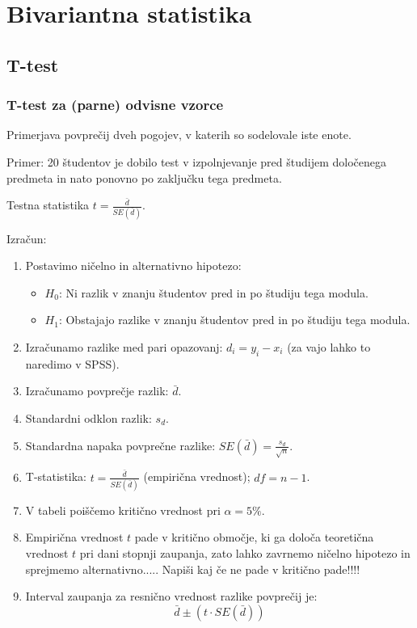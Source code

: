 \section{Bivariantna statistika}

\subsection*{T-test}

\subsubsection*{T-test za (parne) odvisne vzorce}

Primerjava povprečij dveh pogojev, v katerih so sodelovale iste enote.

Primer: 20 študentov je dobilo test v izpolnjevanje pred študijem določenega predmeta in nato ponovno po zaključku tega predmeta.

Testna statistika $t=\frac{\bar{d}}{SE(\bar{d})}$.

Izračun:

\begin{enumerate}
    \item Postavimo ničelno in alternativno hipotezo:
        \begin{itemize}
            \item $H_0$: Ni razlik v znanju študentov pred in po študiju tega modula.
            \item $H_1$: Obstajajo razlike v znanju študentov pred in po študiju tega modula.
        \end{itemize}
    \item Izračunamo razlike med pari opazovanj: $d_i = y_i - x_i$ (za vajo lahko to naredimo v SPSS).
    \item Izračunamo povprečje razlik: $\bar{d}$.
    \item Standardni odklon razlik: $s_d$.
    \item Standardna napaka povprečne razlike: $SE(\bar{d}) = \frac{s_d}{\sqrt{n}}$.
    \item T-statistika: $t = \frac{\bar{d}}{SE(\bar{d})}$ (empirična vrednost); $df = n-1$.
    \item V tabeli poiščemo kritično vrednost pri $\alpha = 5\%$.
    \item Empirična vrednost $t$ pade v kritično območje, ki ga določa teoretična vrednost $t$ pri dani stopnji zaupanja, zato lahko zavrnemo ničelno hipotezo in sprejmemo alternativno..... Napiši kaj če ne pade v kritično pade!!!!
    \item Interval zaupanja za resnično vrednost razlike povprečij je: 
        \[\bar{d} \pm (t \cdot SE(\bar{d}))\]
\end{enumerate}


